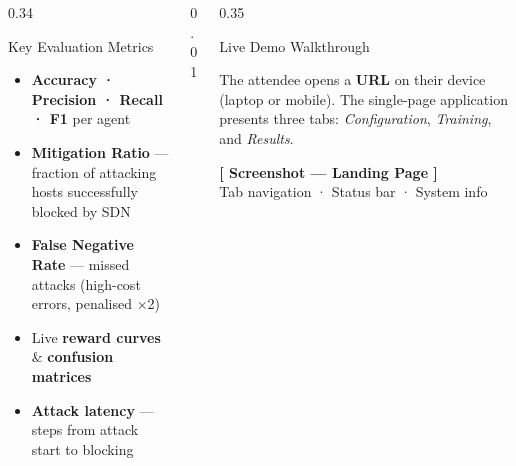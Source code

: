 \documentclass[final]{beamer}
\begin{document}
\begin{frame}[t]
\begin{columns}[T,totalwidth=\textwidth]
\begin{column}{0.34\textwidth}
\vspace{0.6cm}

\begin{block}{Key Evaluation Metrics}
\large
\begin{itemize}[leftmargin=1.2em,itemsep=4pt]
  \item \textbf{Accuracy · Precision · Recall · F1} per agent
  \item \textbf{Mitigation Ratio} — fraction of attacking hosts
        successfully blocked by SDN
  \item \textbf{False Negative Rate} — missed attacks
        (high-cost errors, penalised $\times$2)
  \item Live \textbf{reward curves} \& \textbf{confusion matrices}
  \item \textbf{Attack latency} — steps from attack start to blocking
\end{itemize}
\end{block}

\end{column}

\begin{column}{0.01\textwidth}\end{column}

\begin{column}{0.35\textwidth}

\begin{block}{Live Demo Walkthrough}
\vspace{0.5cm}

\begin{tcolorbox}[demobox,
  title={\large\raisebox{1pt}{\textbf{\textsf{①}}}~Introduction}]
\large
The attendee opens a \textbf{URL} on their device (laptop or mobile).
The single-page application presents three tabs:
\textit{Configuration}, \textit{Training}, and \textit{Results}.

\vspace{0.5cm}
\begin{tcolorbox}[screenshot, height=9cm]
\textbf{[ Screenshot — Landing Page ]}\\[4pt]
Tab navigation · Status bar · System info
\end{tcolorbox}
\end{tcolorbox}


\end{block}
\end{column}
\end{columns}
\end{frame}
\end{document}
